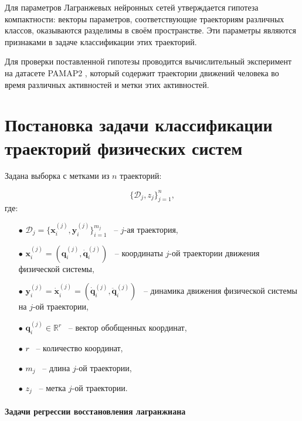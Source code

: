 \documentclass[12pt, twoside]{article}
\begin{document}
    Для параметров Лагранжевых нейронных сетей утверждается гипотеза компактности: векторы параметров, соответствующие траекториям различных классов, оказываются разделимы в своём пространстве. Эти параметры являются признаками в задаче классификации этих траекторий.
    
    Для проверки поставленной гипотезы проводится вычислительный эксперимент на датасете PAMAP2 \cite{PAMAP2}, который содержит траектории движений человека во время различных активностей и метки этих активностей.
    
\section{Постановка задачи классификации траекторий физических систем}

Задана выборка с метками из $n$ траекторий: 

    $$\{ \mathcal{D}_j, z_j\}_{j=1}^n,$$ 
    где:
    \begin{itemize}

        \item[$\bullet$] $\mathcal{D}_j = \{ \mathbf{x}_i^{(j)}, \mathbf{y}_i^{(j)} \}_{i=1}^{m_j}$ ~-- $j$-ая траектория,

        \item[$\bullet$] $\mathbf{x}_i^{(j)} = (\mathbf{q}_i^{(j)}, \mathbf{\dot{q}}_i^{(j)})$ ~-- координаты $j$-ой траектории движения физической системы, 

        \item[$\bullet$] $\mathbf{y}_i^{(j)} = \mathbf{\dot{x}}_i^{(j)} = (\mathbf{\dot{q}}_i^{(j)}, \mathbf{\ddot{q}}_i^{(j)})$ ~-- динамика движения физической системы на $j$-ой траектории, 

        \item[$\bullet$] $\mathbf{q}_i^{(j)} \in \mathbb{R}^r$ ~-- вектор обобщенных координат,

        \item[$\bullet$] $r$ ~-- количество координат,

        \item[$\bullet$] $m_j$ ~-- длина $j$-ой траектории,

        \item[$\bullet$] $z_j$ ~-- метка $j$-ой траектории.
        
    \end{itemize}
        
    \paragraph{Задачи регрессии восстановления лагранжиана}
\end{document}
